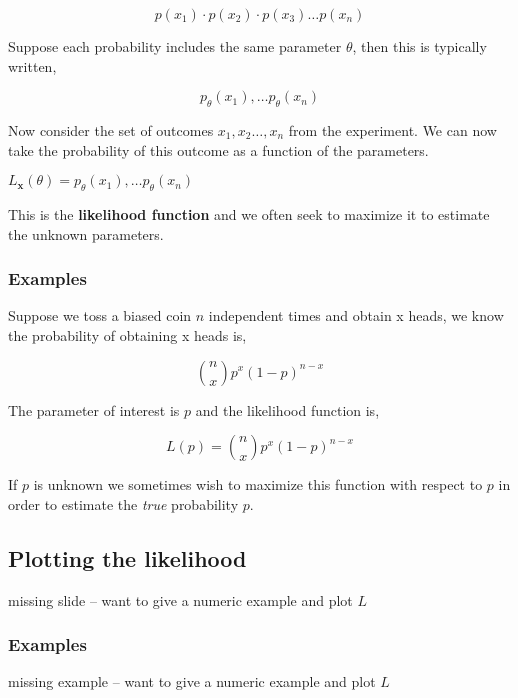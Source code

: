 \documentclass[12pt,a4paper]{article}
\theoremstyle{regla}
\theoremstyle{remark}
\theoremstyle{definition}
\theoremstyle{nonumberbreak}
\begin{document}
$$ p(x_1) \cdot p(x_2) \cdot p(x_3) \ldots p(x_n)$$

 

Suppose each probability includes the same parameter $\theta$, then this is typically written,

$$ {p_{\theta}}(x_1),  \ldots {p_{\theta}}(x_n)$$

 

Now consider the set of outcomes $ x_1, x_2 \ldots, x_n$ from the experiment. We can now take the probability of this outcome as a function of the parameters.
\begin{defn}
$ L_{\mathbf{x}}(\theta) = p_{\theta}(x_1),  \ldots p_{\theta}(x_n)$ 

This is the \textbf{likelihood function} and we often seek to maximize it to estimate the unknown parameters.
\end{defn}
\subsubsection{Examples}
\begin{xmpl}
Suppose we toss a biased coin $n$ independent times and obtain x heads, we know the probability of obtaining x heads is,

$$\binom{n}{x}p^x (1-p)^{n-x}$$

The parameter of interest is $p$ and the likelihood function is,

$$ L(p) = \binom{n}{x}p^x (1-p)^{n-x}$$

If $p$ is unknown we sometimes wish to maximize this function with respect to $p$ in order to estimate the \emph{true} probability $p$.
\end{xmpl}

\subsection{Plotting the likelihood}
\begin{fbox}
\begin{minipage}{0.97\textwidth}
missing slide -- want to give a numeric example and plot $L$
\end{minipage}
\end{fbox}
\subsubsection{Examples}
missing example -- want to give a numeric example and plot $L$
\end{document}
